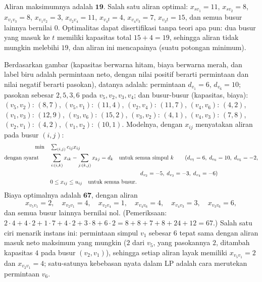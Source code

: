 Aliran maksimumnya adalah $\mathbf{19}$. Salah satu aliran optimal: $x_{s v_1} = 11$, $x_{s v_2} = 8$, $x_{v_1 v_3} = 8$, $x_{v_1 v_2} = 3$, $x_{v_2 v_4} = 11$, $x_{v_4 t} = 4$, $x_{v_4 v_3} = 7$, $x_{v_3 t} = 15$, dan semua busur lainnya bernilai $0$. Optimalitas dapat disertifikasi tanpa teori apa pun: dua busur yang masuk ke $t$ memiliki kapasitas total $15 + 4 = 19$, sehingga aliran tidak mungkin melebihi $19$, dan aliran ini mencapainya (suatu potongan minimum).


Berdasarkan gambar (kapasitas berwarna hitam, biaya berwarna merah, dan label biru adalah permintaan neto, dengan nilai positif berarti permintaan dan nilai negatif berarti pasokan), datanya adalah: permintaan $d_{v_1} = 6$, $d_{v_6} = 10$; pasokan sebesar $2, 5, 3, 6$ pada $v_5, v_2, v_3, v_4$; dan busur-busur (kapasitas, biaya): $(v_5,v_2)$: $(8,7)$, $(v_5,v_1)$: $(11,4)$, $(v_2,v_4)$: $(11,7)$, $(v_4,v_6)$: $(4,2)$, $(v_1,v_3)$: $(12,9)$, $(v_3,v_6)$: $(15,2)$, $(v_3,v_2)$: $(4,1)$, $(v_4,v_3)$: $(7,8)$, $(v_2,v_1)$: $(4,2)$, $(v_1,v_2)$: $(10,1)$. Modelnya, dengan $x_{ij}$ menyatakan aliran pada busur $(i,j)$:
\begin{align*}
\min \quad & \textstyle\sum_{(i,j)} c_{ij} x_{ij}\\
\st \quad & \sum_{i:(i,k)} x_{ik} - \sum_{j:(k,j)} x_{kj} = d_k \quad \text{untuk semua simpul } k \qquad (d_{v_1} = 6,\; d_{v_6} = 10,\; d_{v_5} = -2,\\
& \hspace{16em} d_{v_2} = -5,\; d_{v_3} = -3,\; d_{v_4} = -6)\\
& 0 \leq x_{ij} \leq u_{ij} \quad \text{untuk semua busur}.
\end{align*}
Biaya optimalnya adalah $\mathbf{67}$, dengan aliran
\[
x_{v_5 v_1} = 2, \quad x_{v_2 v_1} = 4, \quad x_{v_2 v_4} = 1, \quad x_{v_4 v_6} = 4, \quad x_{v_4 v_3} = 3, \quad x_{v_3 v_6} = 6,
\]
dan semua busur lainnya bernilai nol. (Pemeriksaan: $2 \cdot 4 + 4 \cdot 2 + 1 \cdot 7 + 4 \cdot 2 + 3 \cdot 8 + 6 \cdot 2 = 8 + 8 + 7 + 8 + 24 + 12 = 67$.) Salah satu ciri menarik instans ini: permintaan simpul $v_1$ sebesar $6$ tepat sama dengan aliran masuk neto maksimum yang mungkin ($2$ dari $v_5$, yang pasokannya $2$, ditambah kapasitas $4$ pada busur $(v_2,v_1)$), sehingga setiap aliran layak memiliki $x_{v_5 v_1} = 2$ dan $x_{v_2 v_1} = 4$; satu-satunya kebebasan nyata dalam LP adalah cara merutekan permintaan $v_6$.

